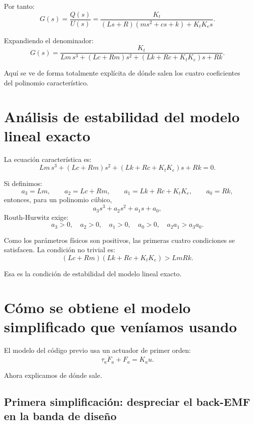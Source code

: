 \documentclass[11pt]{article}
\begin{document}
Por tanto:
\begin{equation}
G(s)=\frac{Q(s)}{U(s)}
=
\frac{K_t}{(Ls+R)(ms^2+cs+k)+K_tK_e s}.
\label{eq:Gexact}
\end{equation}

Expandiendo el denominador:
\begin{equation}
G(s)=
\frac{K_t}
{Lm\,s^3 + (Lc+Rm)s^2 + (Lk+Rc+K_tK_e)s + Rk}.
\label{eq:Gexpanded}
\end{equation}

Aqu\'i se ve de forma totalmente expl\'icita de d\'onde salen los cuatro coeficientes del polinomio caracter\'istico.

\section{An\'alisis de estabilidad del modelo lineal exacto}

La ecuaci\'on caracter\'istica es:
\[
Lm\,s^3 + (Lc+Rm)s^2 + (Lk+Rc+K_tK_e)s + Rk = 0.
\]

Si definimos:
\[
a_3=Lm,\qquad
a_2=Lc+Rm,\qquad
a_1=Lk+Rc+K_tK_e,\qquad
a_0=Rk,
\]
entonces, para un polinomio c\'ubico,
\[
a_3 s^3 + a_2 s^2 + a_1 s + a_0,
\]
Routh-Hurwitz exige:
\begin{equation}
a_3>0,\quad a_2>0,\quad a_1>0,\quad a_0>0,\quad a_2a_1>a_3a_0.
\label{eq:RH}
\end{equation}

Como los par\'ametros f\'isicos son positivos, las primeras cuatro condiciones se satisfacen. La condici\'on no trivial es:
\begin{equation}
(Lc+Rm)(Lk+Rc+K_tK_e) > LmRk.
\label{eq:RHcond}
\end{equation}

Esa es la condici\'on de estabilidad del modelo lineal exacto.

\section{C\'omo se obtiene el modelo simplificado que ven\'iamos usando}

El modelo del c\'odigo previo usa un actuador de primer orden:
\begin{equation}
\tau_a \dot F_a + F_a = K_a u.
\label{eq:force1st}
\end{equation}

Ahora explicamos de d\'onde sale.

\subsection{Primera simplificaci\'on: despreciar el back-EMF en la banda de dise\~no}
\end{document}
